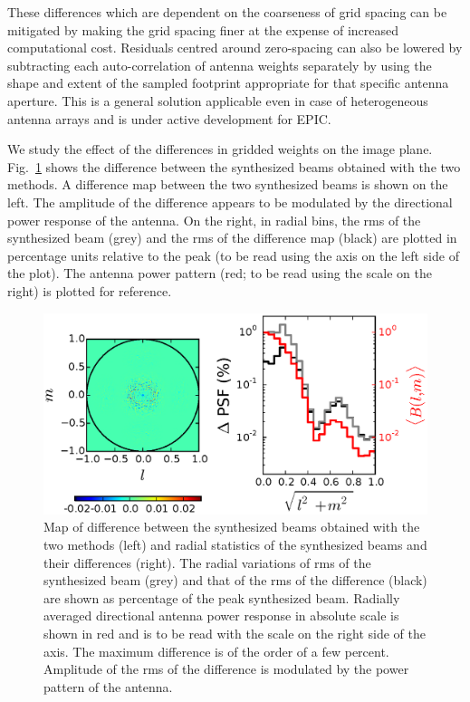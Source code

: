 \documentclass[a4paper,fleqn,usenatbib]{mnras}
\begin{document}
These differences which are dependent on the coarseness of grid spacing can be mitigated by making the grid spacing finer at the expense of increased computational cost. Residuals centred around zero-spacing can also be lowered by subtracting each auto-correlation of antenna weights separately by using the shape and extent of the sampled footprint appropriate for that specific antenna aperture. This is a general solution applicable even in case of heterogeneous antenna arrays and is under active development for EPIC.

We study the effect of the differences in gridded weights on the image plane. Fig.~\ref{fig:image-psf-diff} shows the difference between the synthesized beams obtained with the two methods. A difference map between the two synthesized beams is shown on the left. The amplitude of the difference appears to be modulated by the directional power response of the antenna. On the right, in radial bins, the rms of the synthesized beam (grey) and the rms of the difference map (black) are plotted in percentage units relative to the peak (to be read using the axis on the left side of the plot). The antenna power pattern (red; to be read using the scale on the right) is plotted for reference. 

\begin{figure}
  \includegraphics[width=\columnwidth]{figure8}
  \caption{Map of difference between the synthesized beams obtained with the two methods (left) and radial statistics of the synthesized beams and their differences (right). The radial variations of rms of the synthesized beam (grey) and that of the rms of the difference (black) are shown as percentage of the peak synthesized beam. Radially averaged directional antenna power response in absolute scale is shown in red and is to be read with the scale on the right side of the axis. The maximum difference is of the order of a few percent. Amplitude of the rms of the difference is modulated by the power pattern of the antenna.}
  \label{fig:image-psf-diff}
\end{figure}
\end{document}
